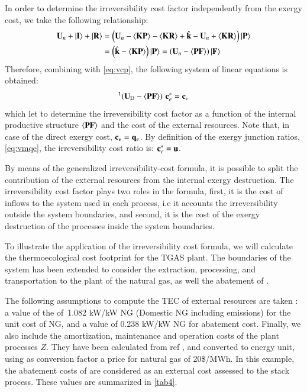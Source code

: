 \documentclass{ecos2018}
\begin{document}
In order to determine the irreversibility cost factor independently from the exergy cost, we take the following relationship:
\begin{equation}
\begin{split}
\mathbf{U}_n+\left| {\textbf{I} } \right\rangle+\left| {\textbf{R} } \right\rangle&=\left(\mathbf{U}_n-\langle \textbf{KP} \rangle-\langle \textbf{KR} \rangle+\hat{\mathbf{k}}-\mathbf{U}_n+\langle \textbf{KR} \rangle\right)\left| {\textbf{P} } \right\rangle\\
&=\left(\hat{\mathbf{k}}-\langle \textbf{KP} \rangle\right)\left| {\textbf{P} } \right\rangle=\left(\mathbf{U}_n-\langle \textbf{PF} \rangle\right)\left| {\textbf{F} } \right\rangle
\end{split}
\end{equation}
Therefore, combining with \cref{eq:vcp}, the following system of linear equations is obtained:
\begin{equation}
\prescript{\smash{\mathsf{t}}}{}{\mskip-1mu}\left(\mathbf{U}_\mathrm{D}-\langle \textbf{PF} \rangle\right)\,\mathbf{c}_{e}^{*}=\mathbf{c}_{e}
\end{equation}
which let to determine the irreversibility cost factor as a function of the internal productive structure $\langle \textbf{PF} \rangle$ and the cost of the external resources. Note that, in case of the direct exergy cost, $\mathbf{c}_e = \mathbf{q}_e$.  By definition of the exergy junction ratios, \cref{eq:vmqe}, the irreversibility cost ratio is: $\mathbf{c}_{e}^{*}=\mathbf{u}$.

By means of the generalized irreversibility-cost formula, it is possible to split the contribution of the external resources from the internal exergy destruction. The irreversibility cost factor plays two roles in the formula, first, it is the cost of inflows to the system used in each process, i.e it accounts the irreversibility outside the system boundaries, and second, it is the cost of the exergy destruction of the processes inside the system boundaries.

To illustrate the application of the irreversibility cost formula, we will calculate the thermoecological cost footprint for the TGAS plant. The boundaries of the system has been extended to consider the extraction, processing, and transportation to the plant of the natural gas, as well the abatement of .

The following assumptions to compute the TEC of external resources are taken \cite{Uson2015}: a value of the of~1.082 kW/kW NG (Domestic NG including  emissions) for the unit cost of NG, and a value of 0.238 kW/kW NG for  abatement cost. Finally, we also include the amortization, maintenance and operation costs of the plant processes $Z$. They have been calculated from ref \cite{CGAM1994}, and converted to energy unit, using as conversion factor a price for natural gas of 20\$/MWh. In this example, the abatement costs of  are considered as an external cost assessed to the stack process. These values are summarized in \cref{tab4}.
\end{document}
